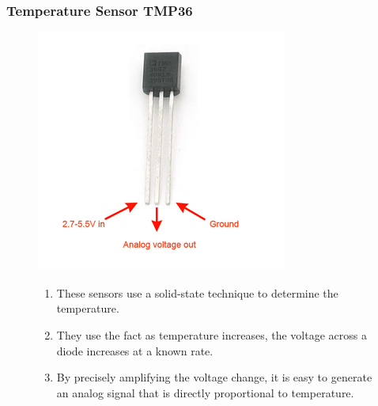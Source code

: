 \documentclass{beamer}
\begin{document}
\frame
{
	\frametitle{Temperature Sensor TMP36}
	\begin{figure}[htbp]
	\begin{minipage}[t]{4.65cm}
	\vspace{1pt}
	\centering
	\includegraphics[width=\textwidth]{../Images/TMP36.png}
	\end{minipage}
	\hfill
	\begin{minipage}[t]{5cm}
	\vspace{10pt}
	\begin{enumerate}
	\item These sensors use a solid-state technique to determine the temperature. 
	\item They use the fact as temperature increases, the voltage across a diode increases at a known rate. 
	\item By precisely amplifying the voltage change, it is easy to generate an analog signal that is directly proportional to temperature. 
	\end{enumerate}
	\end{minipage}
	\end{figure}
	
}
\end{document}

